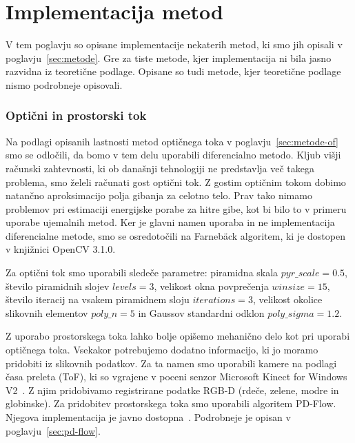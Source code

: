 \chapter{Implementacija metod}
V tem poglavju so opisane implementacije nekaterih metod, ki smo jih opisali v poglavju~\ref{sec:metode}. Gre za tiste metode, kjer implementacija ni bila jasno razvidna iz teoretične podlage. Opisane so tudi metode, kjer teoretične podlage nismo podrobneje opisovali.

\subsection{Optični in prostorski tok}
Na podlagi opisanih lastnosti metod optičnega toka v poglavju~\ref{sec:metode-of} smo se odločili, da bomo v tem delu uporabili diferencialno metodo. Kljub višji računski zahtevnosti, ki ob današnji tehnologiji ne predstavlja več takega problema, smo želeli računati gost optični tok. Z gostim optičnim tokom dobimo natančno aproksimacijo polja gibanja za celotno telo. Prav tako nimamo problemov pri estimaciji energijske porabe za hitre gibe, kot bi bilo to v primeru uporabe ujemalnih metod. Ker je glavni namen uporaba in ne implementacija diferencialne metode, smo se osredotočili na Farneb{\"a}ck algoritem, ki je dostopen v knjižnici OpenCV 3.1.0.

Za optični tok smo uporabili sledeče parametre: piramidna skala $pyr\_scale=\num{0.5}$, število piramidnih slojev $levels=3$, velikost okna povprečenja $winsize=15$, število iteracij na vsakem piramidnem sloju $iterations=3$, velikost okolice slikovnih elementov $poly\_n=5$ in Gaussov standardni odklon $poly\_sigma=\num{1.2}$.

Z uporabo prostorskega toka lahko bolje opišemo mehanično delo kot pri uporabi optičnega toka. Vsekakor potrebujemo dodatno informacijo, ki jo moramo pridobiti iz slikovnih podatkov. Za ta namen smo uporabili kamere na podlagi časa preleta (ToF), ki so vgrajene v poceni senzor Microsoft Kinect for Windows V2~\cite{Yang2015KinectV2}. Z njim pridobivamo registrirane podatke RGB-D (rdeče, zelene, modre in globinske). Za pridobitev prostorskega toka smo uporabili algoritem PD-Flow. Njegova implementacija je javno dostopna~\cite{jaimez2015primal}. Podrobneje je opisan v poglavju~\ref{sec:pd-flow}.



